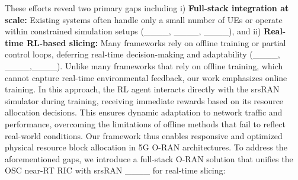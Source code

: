 
These efforts reveal two primary gaps including 
i) \textbf{Full-stack integration at scale:}  Existing systems often handle only a small number of UEs or operate within constrained simulation setups (____, ____, ____), and ii)
 \textbf{Real-time RL-based slicing:} Many frameworks rely on offline training or partial control loops, deferring real-time decision-making and adaptability (____, ____,____). Unlike many frameworks that rely on offline training, which cannot capture real-time environmental feedback, our work emphasizes online training. In this approach, the RL agent interacts directly with the srsRAN simulator during training, receiving immediate rewards based on its resource allocation decisions. This ensures dynamic adaptation to network traffic and performance, overcoming the limitations of offline methods that fail to reflect real-world conditions. Our framework thus enables responsive and optimized physical resource block allocation in 5G O-RAN architectures.
To address the aforementioned gaps, we introduce a full-stack O-RAN solution that unifies the OSC near-RT RIC with srsRAN ____ for real-time slicing:

